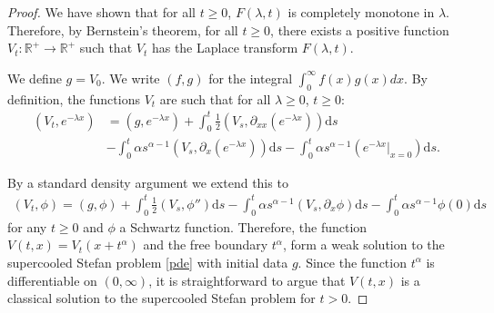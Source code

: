 \documentclass[11pt]{article}
\theoremstyle{plain}
\theoremstyle{remark}
\theoremstyle{definition}
\numberwithin{equation}{section}
\begin{document}
\begin{proof}
We have shown that for all $t\geq 0$, $F(\lambda,t)$ is completely monotone in $\lambda$. Therefore, by Bernstein's theorem, for all $t\geq 0$, there exists a positive function $V_t:\mathbb{R}^+\rightarrow \mathbb{R^+}$ such that $V_t$ has the Laplace transform $F(\lambda,t)$. 

We define $g=V_0$. We write $(f,g)$ for the integral $\int_0^\infty f(x)g(x)dx$.  
By definition, the functions $V_t$ are such that for all $\lambda\geq 0$, $t\geq 0$:
\begin{align*}
    (V_t,e^{-\lambda x})&=(g,e^{-\lambda x})+\int_0^t\frac{1}{2}(V_s,\partial_{xx}\left(e^{-\lambda x}\right))\textrm{d}s\\&-\int_0^t\alpha s^{\alpha-1}(V_s,\partial_x\left(e^{-\lambda x}\right))\textrm{d}s-\int_0^t\alpha s^{\alpha -1}(e^{-\lambda x}|_{x=0})\textrm{d}s.
\end{align*}

By a standard density argument we extend this to 
\begin{align*}
    (V_t,\phi)=(g,\phi)+\int_0^t\frac{1}{2}(V_s,\phi'')\textrm{d}s-\int_0^t\alpha s^{\alpha-1}(V_s,\partial_x\phi)\textrm{d}s-\int_0^t\alpha s^{\alpha -1}\phi(0)\textrm{d}s
\end{align*}
for any $t\geq 0$ and $\phi$ a Schwartz function. Therefore, the function $V(t,x)=V_t(x+t^\alpha)$ and the free boundary $t^\alpha$, form a weak solution to the supercooled Stefan problem \eqref{pde} with initial data $g$. Since the function $t^\alpha$ is differentiable on $(0,\infty)$, it is straightforward to argue that $V(t,x)$ is a classical solution to the supercooled Stefan problem for $t>0$.
\end{proof}
\end{document}
